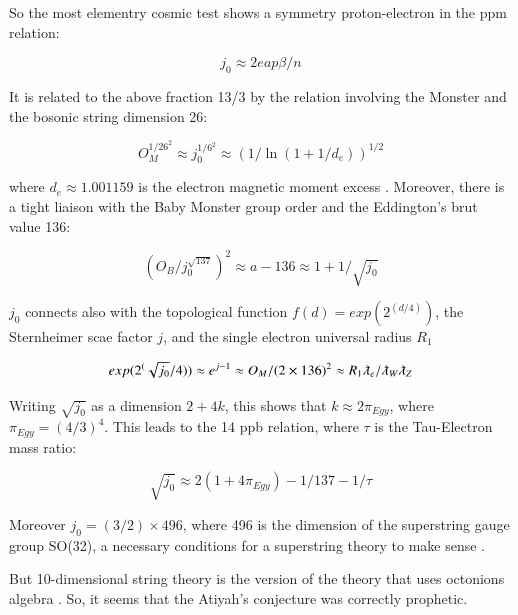 \documentclass[a4paper,9pt]{article}
\begin{document}
So the most elementry cosmic test shows a symmetry proton-electron in the ppm relation:

\begin{equation}
j_0 \approx 2eap\beta/n 
\end{equation}


It is related to the above fraction 13/3 by the relation involving the Monster and the bosonic string dimension 26:

\begin{equation}
  O_M^{1/26^2} \approx j_0^{1/6^2}\approx (1/\ln(1+1/d_e))^{1/2}   
\end{equation}

where $d_e \approx 1.001159$ is the electron magnetic moment excess \cite{Tanabashi}.
 Moreover, there is a tight liaison with the Baby Monster group order and the Eddington's brut value 136:
 
 \begin{equation}
 ( O_B/ j_0^{\sqrt{137}})^2 \approx a -136 \approx 1 + 1/\sqrt{j_0}
\end{equation}

$j_0$ connects also with the topological function $f(d ) = exp(2^(d/4))$, the Sternheimer scae factor $j$, and the single electron universal radius $R_1$ \cite{Sanchez}
 
 \begin{equation}
 exp(2^(\sqrt{j_0}/4)) \approx e^{j -1} \approx O_M/(2\times 136)^2 \approx R_1 \lambdabar_e / \lambdabar_W \lambdabar_Z
\end{equation}

Writing $\sqrt{j_0}$ as a dimension $2+4k$, this shows that $k \approx 2 \pi_{Egy}$, where $\pi_{Egy} = (4/3)^4$. This leads to the 14 ppb relation, where $\tau$ is the Tau-Electron mass ratio: 

\begin{equation}
 \sqrt{j_0} \approx 2 (1+4\pi_{Egy}) - 1/137 -1/\tau
\end{equation}
 

Moreover $j_0 = (3/2) \times 496$, where 496 is the dimension of the superstring gauge group SO(32), a necessary conditions for a superstring theory to make sense \cite{Green}.


But 10-dimensional string theory is the version of the theory that uses octonions algebra \cite{Schlay}. So, it seems that the Atiyah's conjecture was correctly prophetic.
\end{document}
